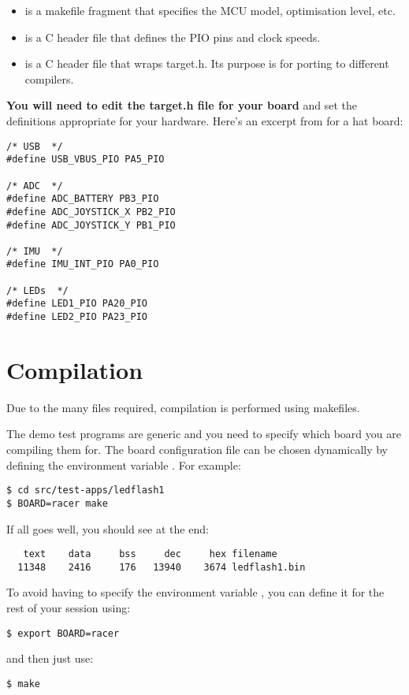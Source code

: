 \begin{itemize}
\item
   is a makefile fragment that specifies the MCU model,
  optimisation level, etc.
\item
   is a C header file that defines the PIO pins and
  clock speeds.
\item
   is a C header file that wraps target.h. Its purpose
  is for porting to different compilers.
\end{itemize}

\textbf{You will need to edit the target.h file for your board} and set
the definitions appropriate for your hardware. Here's an excerpt from
 for a hat board:

\begin{verbatim}
/* USB  */
#define USB_VBUS_PIO PA5_PIO

/* ADC  */
#define ADC_BATTERY PB3_PIO
#define ADC_JOYSTICK_X PB2_PIO
#define ADC_JOYSTICK_Y PB1_PIO

/* IMU  */
#define IMU_INT_PIO PA0_PIO

/* LEDs  */
#define LED1_PIO PA20_PIO
#define LED2_PIO PA23_PIO
\end{verbatim}


\section{Compilation}
\label{compilation}

Due to the many files required, compilation is performed using
makefiles.

The demo test programs are generic and you need to specify which board
you are compiling them for. The board configuration file can be chosen
dynamically by defining the environment variable . For
example:
%
\begin{verbatim}
$ cd src/test-apps/ledflash1
$ BOARD=racer make
\end{verbatim}

If all goes well, you should see at the end:
%
\begin{verbatim}
   text    data     bss     dec     hex filename
  11348	   2416	    176	  13940	   3674	ledflash1.bin
\end{verbatim}

To avoid having to specify the environment variable , you
can define it for the rest of your session using:
%
\begin{verbatim}
$ export BOARD=racer
\end{verbatim}
%
and then just use:
%
\begin{verbatim}
$ make
\end{verbatim}

